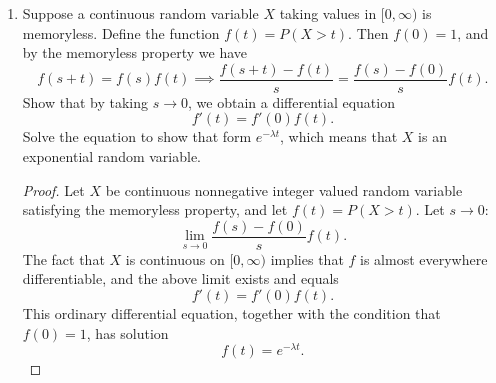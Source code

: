 \documentclass[oneside,reqno]{amsart}
\theoremstyle{definition}
\begin{document}
\begin{enumerate}
\item
Suppose a continuous random variable $X$ taking values in $[0, \infty)$ is memoryless. Define the function $f(t) = P(X > t)$. Then $f(0)=1$, and by the memoryless property we have 
\[
	f(s+t) = f(s)f(t) \implies \frac{f(s+t) - f(t)}{s} = \frac{f(s) - f(0)}{s} f(t).
\] 
Show that by taking $s \to 0$, we obtain a differential equation 
\[
	f'(t) = f'(0)f(t).
\]
Solve the equation to show that form $e^{-\lambda t}$, which means that $X$ is an exponential random variable. 
\begin{proof}


Let $X$ be continuous nonnegative integer valued random variable satisfying the memoryless property, and let $f(t) = P(X > t)$. Let $s \to 0$: 
\[
	\lim_{s \to 0} \frac{f(s) - f(0)}{s} f(t).
\]
The fact that $X$ is continuous on $[0, \infty)$ implies that $f$ is almost everywhere differentiable, and the above limit exists and equals 
\[
	f'(t) = f'(0) f(t).
\]
This ordinary differential equation, together with the condition that $f(0)=1$, has solution
\[
	f(t) = e^{-\lambda t}.
\]
\end{proof}
\end{enumerate}
\end{document}
